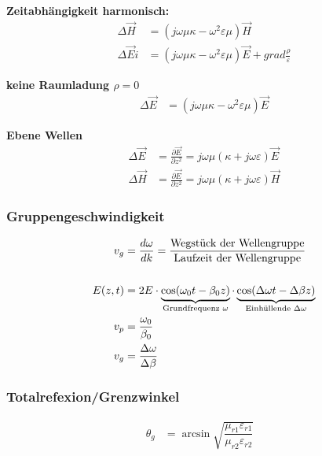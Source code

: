 \textbf{Zeitabhängigkeit harmonisch:}
\begin{align*}
    \Delta \vec{H}   & = (j \omega \mu \kappa - \omega^2 \varepsilon \mu ) \vec{H}                                  \\
    \Delta \vec{E} i & = (j \omega \mu \kappa - \omega^2 \varepsilon \mu ) \vec{E} + grad \frac{ \rho}{\varepsilon}
\end{align*}

\textbf{keine Raumladung $ \rho = 0$}
\begin{align*}
    \Delta \vec{E} & = (j \omega \mu \kappa - \omega^2 \varepsilon \mu ) \vec{E}
\end{align*}

\textbf{Ebene Wellen}
\begin{align*}
    \Delta \vec{E} & = \frac{ \partial \vec{E}}{ \partial z^2} = j \omega \mu ( \kappa + j \omega \varepsilon) \vec{E} \\
    \Delta \vec{H} & = \frac{ \partial \vec{E}}{ \partial z^2} = j \omega \mu ( \kappa + j \omega \varepsilon) \vec{H}
\end{align*}


\subsubsection{Gruppengeschwindigkeit}
\begin{align*}   
    v_g        &= \dfrac{d \omega}{d k} = \dfrac{\textnormal{Wegstück der Wellengruppe}}{\textnormal{Laufzeit der Wellengruppe}}    \\                                                                                                                                                                                     \\
    E(z,t)     & = 2E\cdot\underbrace{\cos(\omega_0t-\beta_0z)}_{\mathclap{\text{Grundfrequenz $\omega$}}}\cdot\underbrace{\cos(\Delta\omega t-\Delta\beta z)}_{\mathclap{\text{Einhüllende $\Delta\omega$}}} \\
    v_p        & = \frac{\omega_0}{\beta_0}                                                                                                                                                                   \\
    v_g        & = \frac{\Delta\omega}{\Delta\beta}
\end{align*}

\subsubsection{Totalrefexion/Grenzwinkel}
\begin{align*}
    \theta_g & = \arcsin \sqrt{ \dfrac{\mu_{r1} \varepsilon_{r1}}{\mu_{r2} \varepsilon_{r2}}} &
\end{align*}

